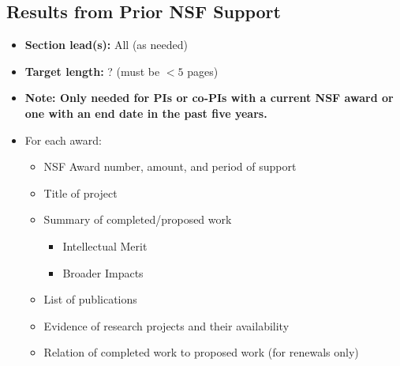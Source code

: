 \documentclass[10pt]{myNSF}
\begin{document}
\subsection{Results from Prior NSF Support}
\label{sec:prior_support}

\begin{itemize}
\item{\textbf{Section lead(s):} All (as needed)}
\item{\textbf{Target length:} ? (must be $< 5$ pages)}
\item{\textbf{Note: Only needed for PIs or co-PIs with a current NSF
      award or one with an end date in the past five years.}}
\item{For each award:}
  \begin{itemize}
  \item{NSF Award number, amount, and period of support}
  \item{Title of project}
  \item{Summary of completed/proposed work}
    \begin{itemize}
    \item{Intellectual Merit}
    \item{Broader Impacts}
    \end{itemize}
  \item{List of publications}
  \item{Evidence of research projects and their availability}
  \item{Relation of completed work to proposed work (for renewals
      only)}
  \end{itemize}
\end{itemize}

{}

\end{document}
